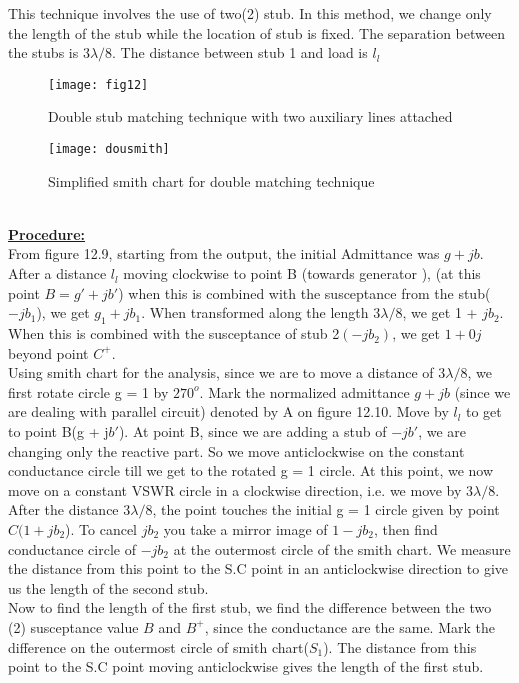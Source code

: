  This technique involves the use of two(2) stub. In this method, we change only the length of the stub while the location of stub is fixed. The separation between the stubs is $ 3\lambda/8$. The distance between stub 1 and load is $l_l$%
\begin{figure}[h]
	\centering
	\texttt{[image: fig12]}
	\caption{Double stub matching technique with two auxiliary lines attached}
	\end{figure}
	\begin{figure}[h]
		\centering
		\texttt{[image: dousmith]}
		\caption{Simplified smith chart for double matching technique}
	\end{figure}\\
\underline{\textbf{Procedure:} } \\

 From figure 12.9, starting from the output, the initial Admittance was $g + jb$. After a distance $l_l$ moving clockwise to point B (towards generator ), (at this point $B = g' + jb'$) when this is combined with the susceptance from the stub($-jb_1$), we get $g_1 +jb_1$. When transformed along the length $3\lambda/8$, we get 1 + $jb_2$. When this is combined with the susceptance of stub 2$(-jb_2)$, we get $1 + 0j$ beyond point $C^+$.\\

Using smith chart for the analysis, since we are to move a distance of $3\lambda/8$, we first rotate circle g = 1  by $270^o$. Mark the normalized admittance $g + jb$  (since we are dealing with parallel circuit) denoted by A on figure 12.10. Move by $l_l$ to get to point B(g + j$b'$). At point B, since we are adding a stub of $-jb'$, we are changing only the reactive part. So we move anticlockwise on the constant conductance circle till we get to the rotated g = 1 circle. At this point, we now move on a constant VSWR circle in a clockwise direction, i.e. we move by $ 3\lambda/8$. After the distance $ 3\lambda/8$, the point touches the initial g = 1 circle given by point $C (1+ jb_2$). To cancel $jb_2$ you take a mirror image of $1-jb_2$, then find conductance circle of $ -jb_2$ at the outermost circle of the smith chart. We measure the distance from this point to the S.C point in an anticlockwise direction to give us the length of the second stub.\\

Now to find the length of the first stub, we find the difference between the two (2) susceptance value $B$ and $B^+$, since the conductance are the same. Mark the difference on the outermost circle of smith chart($S_1$). The distance from this point to the S.C point moving anticlockwise gives the length of the first stub. \\

